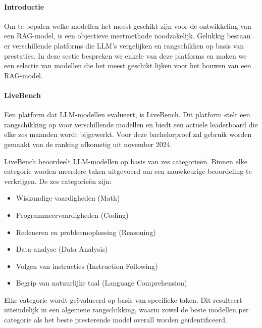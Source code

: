         \paragraph{Introductie}
        Om te bepalen welke modellen het meest geschikt zijn voor de ontwikkeling van een RAG-model, is een objectieve meetmethode noodzakelijk. Gelukkig bestaan er verschillende platforms die LLM's vergelijken en rangschikken op basis van prestaties. In deze sectie bespreken we enkele van deze platforms en maken we een selectie van modellen die het meest geschikt lijken voor het bouwen van een RAG-model.
        
        
        \paragraph{LiveBench} 
        Een platform dat LLM-modellen evalueert, is LiveBench. Dit platform stelt een rangschikking op voor verschillende modellen en biedt een actuele leaderboard die elke zes maanden wordt bijgewerkt. Voor deze bachelorproef zal gebruik worden gemaakt van de ranking afkomstig uit november 2024.
        
        LiveBench beoordeelt LLM-modellen op basis van zes categorieën. Binnen elke categorie worden meerdere taken uitgevoerd om een nauwkeurige beoordeling te verkrijgen. De zes categorieën zijn:
        \begin{itemize}
            \item Wiskundige vaardigheden (Math)
            \item Programmeervaardigheden (Coding)
            \item Redeneren en probleemoplossing (Reasoning)
            \item Data-analyse (Data Analysis)
            \item Volgen van instructies (Instruction Following)
            \item Begrip van natuurlijke taal (Language Comprehension)
        \end{itemize}
        
        Elke categorie wordt geëvalueerd op basis van specifieke taken. Dit resulteert uiteindelijk in een algemene rangschikking, waarin zowel de beste modellen per categorie als het beste presterende model overall worden geïdentificeerd.
        
